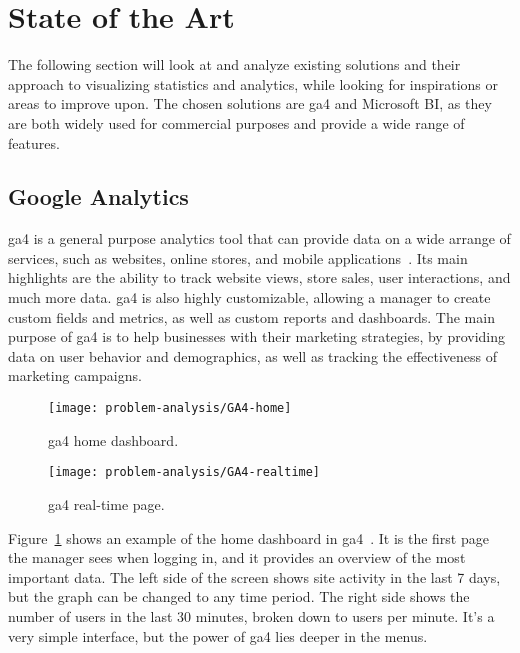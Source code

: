 \section{State of the Art}\label{sec:state-of-the-art}

The following section will look at and analyze existing solutions and their approach to visualizing statistics and
analytics, while looking for inspirations or areas to improve upon.
The chosen solutions are \acrlong{ga4} and Microsoft BI, as they are both widely used for commercial purposes and
provide a wide range of features.

\subsection{Google Analytics}\label{subsec:google-analytics}

\acrfull{ga4} is a general purpose analytics tool that can provide data on a wide arrange of services, such as websites,
online stores, and mobile applications~\cite{ga4}.
Its main highlights are the ability to track website views, store sales, user interactions, and much more data.
\acrshort{ga4} is also highly customizable, allowing a manager to create custom fields and metrics, as well as custom
reports and dashboards.
The main purpose of \acrshort{ga4} is to help businesses with their marketing strategies, by providing data on user
behavior and demographics, as well as tracking the effectiveness of marketing campaigns.

\begin{figure}[H]
    \centering
    \texttt{[image: problem-analysis/GA4-home]}
    \caption{\acrshort{ga4} home dashboard.}\label{fig:GA4-dashboard}
\end{figure}

\begin{figure}[H]
    \centering
    \texttt{[image: problem-analysis/GA4-realtime]}
    \caption{\acrshort{ga4} real-time page.}\label{fig:GA4-realtime}
\end{figure}

Figure~\ref{fig:GA4-dashboard} shows an example of the home dashboard in \acrshort{ga4}~\cite{ga4-interface}.
It is the first page the manager sees when logging in, and it provides an overview of the most important data.
The left side of the screen shows site activity in the last 7 days, but the graph can be changed to any time period.
The right side shows the number of users in the last 30 minutes, broken down to users per minute.
It's a very simple interface, but the power of \acrshort{ga4} lies deeper in the menus.

